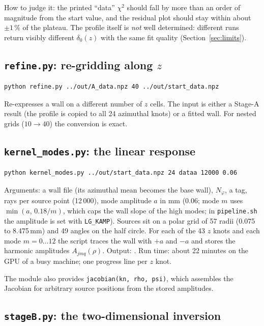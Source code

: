 \documentclass[11pt,a4paper]{article}
\newcommand{\code}[1]{\texttt{#1}}
\begin{document}
How to judge it: the printed ``data'' $\chi^2$ should fall by more than an order of magnitude from the
start value, and the residual plot should stay within about $\pm1\,\%$ of the plateau. The profile
itself is \emph{not} well determined: different runs return visibly different $\delta_0(z)$ with
the same fit quality (Section~\ref{sec:limits}).

\subsection{\texttt{refine.py}: re-gridding along $z$}

\begin{lstlisting}
python refine.py ../out/A_data.npz 40 ../out/start_data.npz
\end{lstlisting}
Re-expresses a wall on a different number of $z$ cells. The input is either a Stage-A result (the
profile is copied to all 24 azimuthal knots) or a fitted wall. For nested grids ($10\to40$) the
conversion is exact.

\subsection{\texttt{kernel\_modes.py}: the linear response}

\begin{lstlisting}
python kernel_modes.py ../out/start_data.npz 24 dataa 12000 0.06
\end{lstlisting}
Arguments: a wall file (its azimuthal mean becomes the base wall), $N_\varphi$, a tag, rays per source
point (12\,000), mode amplitude $a$ in mm (0.06; mode $m$ uses $\min(a,\,0.18/m)$, which caps the
wall slope of the high modes; in \code{pipeline.sh} the amplitude is set with \code{LG\_KAMP}). Sources sit on a
polar grid of 57 radii (0.075 to 8.475\,mm) and 49 angles on the half circle. For each of the 43 $z$
knots and each mode $m=0\ldots12$ the script traces the wall with $+a$ and $-a$ and stores the
harmonic amplitudes $A_{jmq}(\rho)$. Output: . Run time: about 22
minutes on the GPU of a busy machine; one progress line per $z$ knot.

The module also provides \code{jacobian(kn, rho, psi)}, which assembles the Jacobian for arbitrary
source positions from the stored amplitudes.

\subsection{\texttt{stageB.py}: the two-dimensional inversion}
\end{document}
